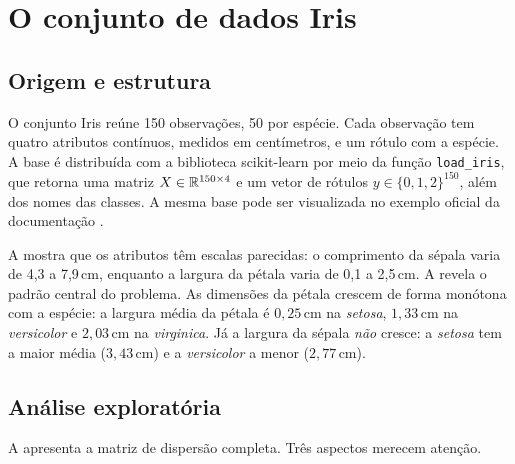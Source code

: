 ﻿%
\section{O conjunto de dados Iris}
\label{sec:dados}

\subsection{Origem e estrutura}

O conjunto Iris reúne 150 observações, 50 por espécie. Cada observação tem quatro atributos
contínuos, medidos em centímetros, e um rótulo com a espécie. A base é distribuída com a biblioteca
scikit-learn \cite{pedregosa2011} por meio da função \texttt{load\_iris}, que retorna uma matriz
$X \in \mathbb{R}^{150 \times 4}$ e um vetor de rótulos $y \in \{0,1,2\}^{150}$, além dos nomes das
classes. A mesma base pode ser visualizada no exemplo oficial da documentação
\cite{sklearn-iris}.

\begin{table}[htbp]
	\centering
	\caption{Estatísticas descritivas dos quatro atributos, em centímetros ($n=150$).}
	\label{tab:estatisticas}
	
\end{table}

\begin{table}[htbp]
	\centering
	\caption{Média $\pm$ desvio-padrão de cada atributo por espécie (cm).}
	\label{tab:estatisticas-classe}
	
\end{table}

A  mostra que os atributos têm escalas parecidas: o comprimento da sépala
varia de 4,3 a 7,9\,cm, enquanto a largura da pétala varia de 0,1 a 2,5\,cm. A
 revela o padrão central do problema. As dimensões da pétala
crescem de forma monótona com a espécie: a largura média da pétala é $0{,}25$\,cm na
\emph{setosa}, $1{,}33$\,cm na \emph{versicolor} e $2{,}03$\,cm na \emph{virginica}. Já a largura
da sépala \emph{não} cresce: a \emph{setosa} tem a maior média ($3{,}43$\,cm) e a
\emph{versicolor} a menor ($2{,}77$\,cm).

\subsection{Análise exploratória}

A  apresenta a matriz de dispersão completa. Três aspectos merecem atenção.

